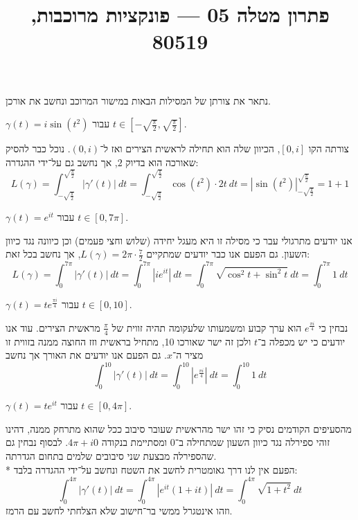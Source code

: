 
\title{פתרון מטלה 05 --- פונקציות מרוכבות, 80519}


\maketitle
\maketitleprint{}

\question{}
נתאר את צורתן של המסילות הבאות במישור המרוכב ונחשב את אורכן.

\subquestion{}
$\gamma(t) = i \sin(t^2)$ עבור $t \in [-\sqrt{\frac{\pi}{2}}, \sqrt{\frac{\pi}{2}}]$.
\begin{solution}
	צורתה הקו $[0, i]$, הכיוון שלה הוא תחילה לראשית הצירים ואז ל־$(0, i)$.
	נוכל כבר להסיק שאורכה הוא בדיוק $2$, אך נחשב גם על־ידי ההגדרה:
	\[
		L(\gamma)
		= \int_{-\sqrt{\frac{\pi}{2}}}^{\sqrt{\frac{\pi}{2}}} |\gamma'(t)|\ dt
		= \int_{-\sqrt{\frac{\pi}{2}}}^{\sqrt{\frac{\pi}{2}}} \cos(t^2) \cdot 2t\ dt
		= |\sin(t^2)|_{-\sqrt{\frac{\pi}{2}}}^{\sqrt{\frac{\pi}{2}}}
		= 1 + 1
	\]
\end{solution}

\subquestion{}
$\gamma(t) = e^{it}$ עבור $t \in [0, 7\pi]$.
\begin{solution}
	אנו יודעים מתרגולי עבר כי מסילה זו היא מעגל יחידה (שלוש וחצי פעמים) וכן כיוונה נגד כיוון השעון.
	גם הפעם אנו כבר יודעים שמתקיים $L(\gamma) = 2\pi \cdot \frac{7}{2}$, אך נחשב בכל זאת:
	\[
		L(\gamma)
		= \int_0^{7\pi} |\gamma'(t)|\ dt
		= \int_0^{7\pi} |i e^{it}|\ dt
		= \int_0^{7\pi} \sqrt{\cos^2 t + \sin^2 t}\ dt
		= \int_0^{7\pi} 1\ dt
	\]
\end{solution}

\subquestion{}
$\gamma(t) = t e^{\frac{\pi i}{4}}$ עבור $t \in [0, 10]$.
\begin{solution}
	נבחין כי $e^{\frac{\pi i}{4}}$ הוא ערך קבוע ומשמעותו שלעקומה תהיה זווית של $\frac{\pi}{4}$ מראשית הצירים. עוד אנו יודעים כי יש מכפלה ב־$t$ ולכן זה ישר שאורכו 10, מתחיל בראשית וזז החוצה ממנה בזווית זו מציר ה־$x$.
	גם הפעם אנו יודעים את האורך אך נחשב
	\[
		\int_0^{10} |\gamma'(t)|\ dt
		= \int_0^{10} |e^{\frac{\pi i}{4}}|\ dt
		= \int_0^{10} 1\ dt
	\]
\end{solution}

\subquestion{}
$\gamma(t) = t e^{it}$ עבור $t \in [0, 4\pi]$.
\begin{solution}
	מהסעיפים הקודמים נסיק כי זהו ישר מהראשית שעובר סיבוב ככל שהוא מתרחק ממנה, דהינו זוהי ספירלה נגד כיוון השעון שמתחילה ב־$0$ ומסתיימת בנקודה $4\pi + i0$.
	לבסוף נבחין גם שהספירלה מבצעת שני סיבובים שלמים בתחום הגדרתה. \\*
	הפעם אין לנו דרך גאומטרית לחשב את השטח ונחשב על־ידי ההגדרה בלבד:
	\[
		\int_{0}^{4\pi} |\gamma'(t)|\ dt
		= \int_{0}^{4\pi} |e^{it} (1 + it)|\ dt
		= \int_0^{4\pi} \sqrt{1 + t^2}\ dt
	\]
	וזהו אינטגרל ממשי בר־חישוב שלא הצלחתי לחשב עם הרמז.
\end{solution}

